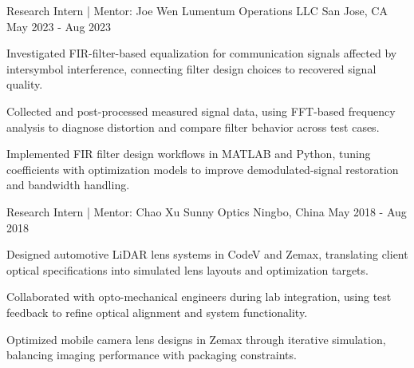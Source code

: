 
\begin{cventries}

  \cventry
    {Research Intern | Mentor: Joe Wen}
    {Lumentum Operations LLC}
    {San Jose, CA}
    {May 2023 - Aug 2023}
    {
      \begin{cvitems}
        \item {Investigated FIR-filter-based equalization for communication signals affected by intersymbol interference, connecting filter design choices to recovered signal quality.}
        \item {Collected and post-processed measured signal data, using FFT-based frequency analysis to diagnose distortion and compare filter behavior across test cases.}
        \item {Implemented FIR filter design workflows in MATLAB and Python, tuning coefficients with optimization models to improve demodulated-signal restoration and bandwidth handling.}
      \end{cvitems}
    }

  \cventry
    {Research Intern | Mentor: Chao Xu}
    {Sunny Optics}
    {Ningbo, China}
    {May 2018 - Aug 2018}
    {
      \begin{cvitems}
        \item {Designed automotive LiDAR lens systems in CodeV and Zemax, translating client optical specifications into simulated lens layouts and optimization targets.}
        \item {Collaborated with opto-mechanical engineers during lab integration, using test feedback to refine optical alignment and system functionality.}
        \item {Optimized mobile camera lens designs in Zemax through iterative simulation, balancing imaging performance with packaging constraints.}
      \end{cvitems}
    }

\end{cventries}
